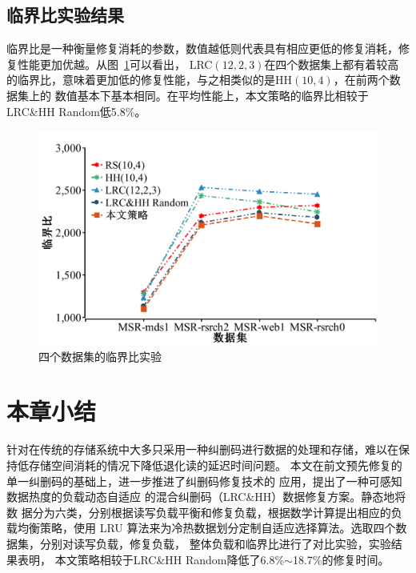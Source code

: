 \subsection{临界比实验结果}

临界比是一种衡量修复消耗的参数，数值越低则代表具有相应更低的修复消耗，修复性能更加优越。从图~\ref{fig:4-9}可以看出，
LRC$(12,2,3)$在四个数据集上都有着较高的临界比，意味着更加低的修复性能，与之相类似的是HH$(10,4)$，在前两个数据集上的
数值基本下基本相同。在平均性能上，本文策略的临界比相较于LRC\&HH Random低5.8\%。

\begin{figure}[htbp]
	\centering
	\includegraphics [scale=0.25]{figures/4-9.pdf}
	\caption{四个数据集的临界比实验}
	\label{fig:4-9}
\end{figure}


\section{本章小结}
针对在传统的存储系统中大多只采用一种纠删码进行数据的处理和存储，难以在保持低存储空间消耗的情况下降低退化读的延迟时间问题。
本文在前文预先修复的单一纠删码的基础上，进一步推进了纠删码修复技术的
应用，提出了一种可感知数据热度的负载动态自适应
的混合纠删码（LRC\&HH）数据修复方案。静态地将数
据分为六类，分别根据读写负载平衡和修复负载，根据数学计算提出相应的负载均衡策略，使用
LRU 算法来为冷热数据划分定制自适应选择算法。选取四个数据集，分别对读写负载，修复负载，
整体负载和临界比进行了对比实验，实验结果表明，
本文策略相较于LRC\&HH Random降低了6.8\%$\sim$18.7\%的修复时间。